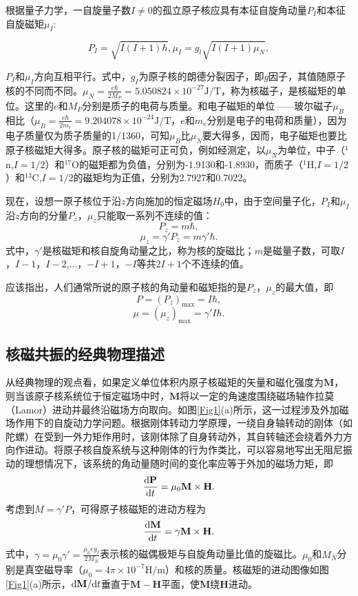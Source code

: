 \documentclass[a4paper]{article}
\begin{document}
根据量子力学，一自旋量子数$I\neq0$的孤立原子核应具有本征自旋角动量$P_I$和本征自旋磁矩$\mu_I$:

$$P_I=\sqrt{I(I+1)\hbar},\mu_I=g_l\sqrt{I(I+1)\mu_N},$$

$P_I$和$\mu_I$方向互相平行。式中，$g_I$为原子核的朗德分裂因子，即$g$因子，其值随原子核的不同而不同。$\mu_N=\frac{e\hbar}{2M_P}=5.050824\times 10^{-27}\text{J/T}$，称为核磁子，是核磁矩的单位。这里的$e$和$M_P$分别是质子的电荷与质量。和电子磁矩的单位——玻尔磁子$\mu_B$相比（$\mu_B=\frac{e\hbar}{2m_e}=9.204078\times 10^{-24}\text{J/T}$，$e$和$m_e$分别是电子的电荷和质量），因为电子质量仅为质子质量的1/1360，可知$\mu_B$比$\mu_N$要大得多，因而，电子磁矩也要比原子核磁矩大得多。原子核的磁矩可正可负，例如经测定，以$\mu_N$为单位，中子（$^1$n,$I=1/2$）和$^{17}$O的磁矩都为负值，分别为-1.9130和-1.8930，而质子（$^{1}$H,$I=1/2$）和$^{13}\text{C}$,$I=1/2$的磁矩均为正值，分别为2.7927和0.7022。

现在，设想一原子核位于沿$z$方向施加的恒定磁场$H_0$中，由于空间量子化，$P_I$和$\mu_I$沿$z$方向的分量$P_z$，$\mu_z$只能取一系列不连续的值：
$$P_z=m\hbar,$$
$$\mu_z=\gamma'P_z=m\gamma'\hbar.$$
式中，$\gamma'$是核磁矩和核自旋角动量之比，称为核的旋磁比；$m$是磁量子数，可取$I$，$I-1$，$I-2$,...，$-I+1$，$-I$等共$2I+1$个不连续的值。

应该指出，人们通常所说的原子核的角动量和磁矩指的是$P_z$，$\mu_z$的最大值，即
$$P=(P_z)_\text{max}=I\hbar,$$
$$\mu=(\mu_z)_\text{max}=\gamma'I\hbar.$$

\subsection{核磁共振的经典物理描述}

从经典物理的观点看，如果定义单位体积内原子核磁矩的矢量和磁化强度为$\mathbf{M}$，则当该原子核系统位于恒定磁场中时，$\mathbf{M}$将以一定的角速度围绕磁场轴作拉莫（Lamor）进动并最终沿磁场方向取向。如图\ref{Fig1}(a)所示，这一过程涉及外加磁场作用下的自旋动力学问题。根据刚体转动力学原理，一绕自身轴转动的刚体（如陀螺）在受到一外力矩作用时，该刚体除了自身转动外，其自转轴还会绕着外力方向作进动。将原子核自旋系统与这种刚体的行为作类比，可以容易地写出无阻尼振动的理想情况下，该系统的角动量随时间的变化率应等于外加的磁场力矩，即
$$\frac{{\rm d}\mathbf{P}}{{\rm d}t}=\mu_0\mathbf{M}\times \mathbf{H}.$$
考虑到$M=\gamma'P$，可得原子核磁矩的进动方程为
$$\frac{{\rm d}\mathbf{M}}{{\rm d}t}=\gamma\mathbf{M}\times \mathbf{H}.$$
式中，$\gamma=\mu_0\gamma'=\frac{\mu_0eg_I}{2M_N}$表示核的磁偶极矩与自旋角动量比值的旋磁比。$\mu_0$和$M_N$分别是真空磁导率（$\mu_0=4\pi\times 10^{-7}\text{H/m}$）和核的质量。核磁矩的进动图像如图\ref{Fig1}(a)所示，${\rm d}\mathbf{M}/{\rm d}t$垂直于$\mathbf{M}-\mathbf{H}$平面，使$\mathbf{M}$绕$\mathbf{H}$进动。
\end{document}
